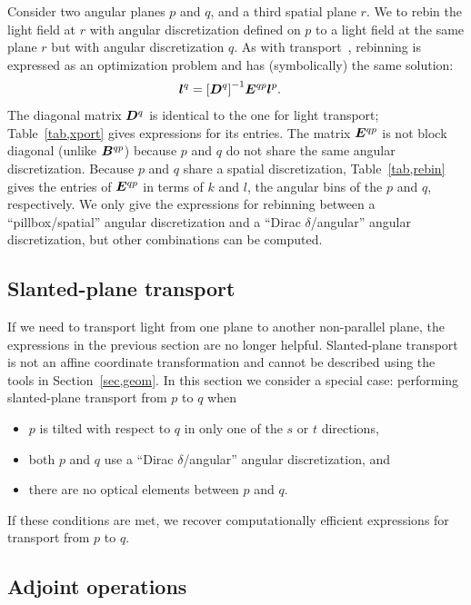 Consider two angular planes $p$ and $q$, and a third spatial plane $r$.  We to
rebin the light field at $r$ with angular discretization defined on $p$ to a
light field at the same plane $r$ but with angular discretization $q$. As with
transport~, rebinning is expressed as an optimization problem
and has (symbolically) the same solution:
\begin{align}
    {\ensuremath{\bm{l}}}^q &=  {\left[ {\bm{D}}^q \right] }^{-1} {\bm{E}}^{qp} {\bm{l}}^p.
\end{align}
The diagonal matrix ${\bm{D}}^q$ is identical to the one for light transport;
Table~\ref{tab,xport} gives expressions for its entries.  The matrix ${\bm{E}}^{qp}$
is not block diagonal (unlike ${\bm{B}}^{qp}$) because $p$ and $q$ do not share the
same angular discretization.  Because $p$ and $q$ share a spatial
discretization, Table~\ref{tab,rebin} gives the entries of ${\bm{E}}^{qp}$ in terms
of $k$ and $l$, the angular bins of the $p$ and $q$, respectively.  We only
give the expressions for rebinning between a ``pillbox/spatial'' angular
discretization and a ``Dirac $\delta$/angular'' angular discretization, but
other combinations can be computed.



\subsection{Slanted-plane transport}

If we need to transport light from one plane to another non-parallel plane,
the expressions in the previous section are no longer helpful.  Slanted-plane
transport is not an affine coordinate transformation and cannot be described
using the tools in Section~\ref{sec,geom}.  In this section we consider a
special case: performing slanted-plane transport from $p$ to $q$ when
\begin{itemize}
    \item $p$ is tilted with respect to $q$ in only one of the $s$ or $t$ directions,
    \item both $p$ and $q$ use a ``Dirac $\delta$/angular'' angular discretization, and
    \item there are no optical elements between $p$ and $q$.
\end{itemize}
If these conditions are met, we recover computationally efficient expressions
for transport from $p$ to $q$.

\subsection{Adjoint operations}

